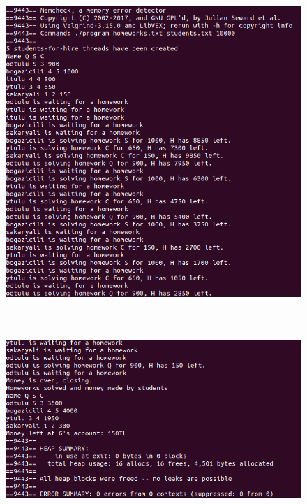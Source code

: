 \documentclass[12pt]{report}
\renewcommand{\_}{\kern-1.5pt\textunderscore\kern-1.5pt}
\begin{document}
\vspace{\baselineskip}
\vspace{\baselineskip}

\vspace{\baselineskip}

\vspace{\baselineskip}

\vspace{\baselineskip}



\begin{figure}[H]
	\begin{Center}
		\includegraphics[width=5.0in,height=4.92in]{./image3.png}
	\end{Center}
\end{figure}




\vspace{\baselineskip}


\begin{figure}[H]
	\begin{Center}
		\includegraphics[width=5.0in,height=2.68in]{./image4.png}
	\end{Center}
\end{figure}




\vspace{\baselineskip}\printbibliography
\end{document}
